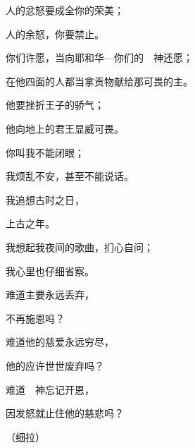 {\BB \par }{\Q {}人的忿怒要成全你的荣美；
\par }{\Q 人的余怒，你要禁止。
\par }{\Q {}你们许愿，当向耶和华—你们的　神还愿；
\par }{\Q 在他四面的人都当拿贡物献给那可畏的主。
\par }{\Q {}他要挫折王子的骄气；
\par }{\Q 他向地上的君王显威可畏。

\par }
{\Q {}你叫我不能闭眼；
\par }{\Q 我烦乱不安，甚至不能说话。
\par }{\Q {}我追想古时之日，
\par }{\Q 上古之年。
\par }{\Q {}我想起我夜间的歌曲，扪心自问；
\par }{\Q 我心里也仔细省察。
\par }{\Q {}难道主要永远丢弃{}，
\par }{\Q 不再施恩吗？
\par }{\Q {}难道他的慈爱永远穷尽，
\par }{\Q 他的应许世世废弃吗？
\par }{\Q {}难道　神忘记开恩，
\par }{\Q 因发怒就止住他的慈悲吗？
\par }{\QS （细拉）
\par }

